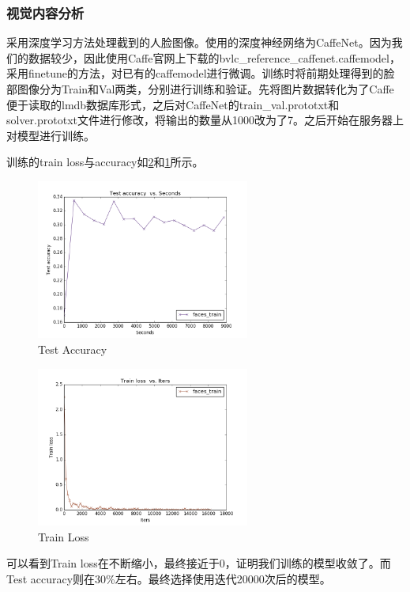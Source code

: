\documentclass{article}
\begin{document}
\begin{multicols}{2}
            \subsubsection{视觉内容分析}
                采用深度学习方法处理截到的人脸图像。使用的深度神经网络为CaffeNet。因为我们的数据较少，因此使用Caffe官网上下载的bvlc\_reference\_caffenet.caffemodel，采用finetune的方法，对已有的caffemodel进行微调。训练时将前期处理得到的脸部图像分为Train和Val两类，分别进行训练和验证。先将图片数据转化为了Caffe便于读取的lmdb数据库形式，之后对CaffeNet的train\_val.prototxt和solver.prototxt文件进行修改，将输出的数量从1000改为了7。之后开始在服务器上对模型进行训练。

                训练的train loss与accuracy如\ref{fig:4}和\ref{fig:3}所示。
                \begin{figure}[H]
                  \centering
                  \includegraphics[width=7cm]{test_accuracy.png}
                  \caption{Test Accuracy}\label{fig:3}
                \end{figure}
                \begin{figure}[H]
                  \centering
                  \includegraphics[width=7cm]{train_loss.png}
                  \caption{Train Loss}\label{fig:4}
                \end{figure}

                可以看到Train loss在不断缩小，最终接近于0，证明我们训练的模型收敛了。而Test accuracy则在30\%左右。最终选择使用迭代20000次后的模型。


\end{multicols}
\end{document}
